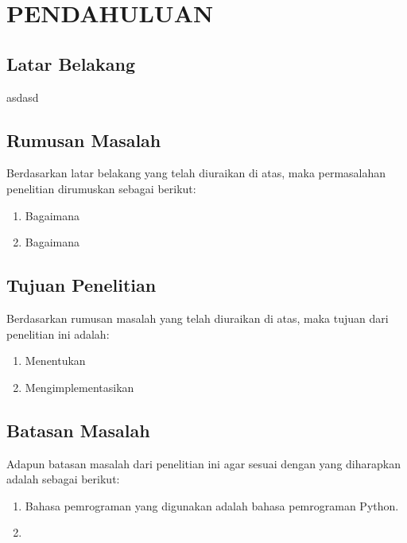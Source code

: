 \newpage
\pagestyle{fancy}
\fancyhf{}
\fancyhead[R]{\thepage}
\chapter{PENDAHULUAN} \label{Bab I}

\section{Latar Belakang} \label{I.Latar Belakang}
asdasd

\section{Rumusan Masalah} \label{I.Rumusan Masalah}

Berdasarkan latar belakang yang telah diuraikan di atas, maka permasalahan penelitian dirumuskan sebagai berikut: \par

\begin{enumerate}[noitemsep]
	\item Bagaimana
	\item Bagaimana 
\end{enumerate}


\section{Tujuan Penelitian} \label{I.Tujuan}
Berdasarkan rumusan masalah yang telah diuraikan di atas, maka tujuan dari penelitian ini adalah: \par

\begin{enumerate}[noitemsep]
	\item Menentukan 
	\item Mengimplementasikan
\end{enumerate}


\section{Batasan Masalah} \label{I.Batasan}
Adapun batasan masalah dari penelitian ini agar sesuai dengan yang diharapkan adalah sebagai berikut: \par

\begin{enumerate}[noitemsep]
    \item Bahasa pemrograman yang digunakan adalah bahasa pemrograman Python.
    \item 
\end{enumerate}


